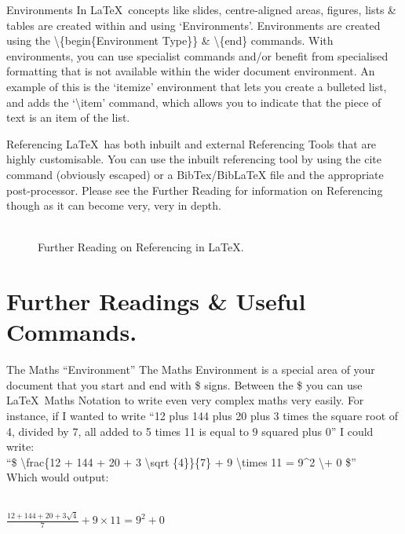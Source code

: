 \documentclass{beamer}
\begin{document}
\begin{frame}{Environments}%
In \LaTeX~concepts like slides, centre-aligned areas, figures, lists \& tables are created within and using `Environments'. Environments are created using the \textbackslash\{begin\{Environment Type\}\} \&  \textbackslash\{end\} commands. With environments, you can use specialist commands and/or benefit from specialised formatting that is not available within the wider document environment. An example of this is the `itemize' environment that lets you create a bulleted list, and adds the  `\textbackslash item' command, which allows you to indicate that the piece of text is an item of the list.
\end{frame}

\begin{frame}{Referencing}
\LaTeX~has both inbuilt and external Referencing Tools that are highly customisable. You can use the inbuilt referencing tool by using the cite command (obviously escaped) or a BibTex/BibLaTeX file and the appropriate post-processor. Please see the Further Reading for information on Referencing though as it can become very, very in depth.
\begin{figure}[h]
\\
Further Reading on Referencing in \LaTeX.
\end{figure}
\end{frame}

\section{Further Readings \& Useful Commands.}
\begin{frame}{The Maths ``Environment''}
The Maths Environment is a special area of your document that you start and end with \$ signs. Between the \$ you can use \LaTeX~Maths Notation to write even very complex maths very easily. For instance, if I wanted to write ``12 plus 144 plus 20 plus 3 times the square root of 4, divided by 7, all added to 5 times 11 is equal to 9 squared plus 0'' I could write:\\ ``\$ \textbackslash frac\{12 + 144 + 20 + 3 \textbackslash sqrt \{4\}\}\{7\}  + 9 \textbackslash times 11 = 9\^{}{2} \textbackslash + 0 \$''\\
Which would output:\begin{centering}\\$\frac{12+144+20+3\sqrt{4}}{7} + 9 \times 11 = 9^2 + 0$\end{centering}
\end{frame}
\end{document}
